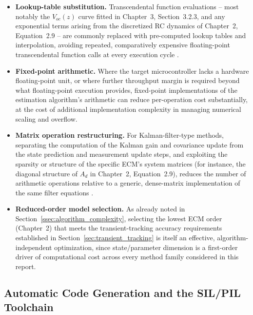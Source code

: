 \begin{itemize}
	\item \textbf{Lookup-table substitution.} Transcendental function evaluations -- most notably the $V_{oc}(z)$ curve fitted in Chapter~3, Section~3.2.3, and any exponential terms arising from the discretized RC dynamics of Chapter~2, Equation~2.9 -- are commonly replaced with pre-computed lookup tables and interpolation, avoiding repeated, comparatively expensive floating-point transcendental function calls at every execution cycle \cite{ekf_embedded_optimization_researchgate}.
	\item \textbf{Fixed-point arithmetic.} Where the target microcontroller lacks a hardware floating-point unit, or where further throughput margin is required beyond what floating-point execution provides, fixed-point implementations of the estimation algorithm's arithmetic can reduce per-operation cost substantially, at the cost of additional implementation complexity in managing numerical scaling and overflow.
	\item \textbf{Matrix operation restructuring.} For Kalman-filter-type methods, separating the computation of the Kalman gain and covariance update from the state prediction and measurement update steps, and exploiting the sparsity or structure of the specific ECM's system matrices (for instance, the diagonal structure of $A_d$ in Chapter~2, Equation~2.9), reduces the number of arithmetic operations relative to a generic, dense-matrix implementation of the same filter equations \cite{ekf_embedded_optimization_researchgate}.
	\item \textbf{Reduced-order model selection.} As already noted in Section~\ref{ssec:algorithm_complexity}, selecting the lowest ECM order (Chapter~2) that meets the transient-tracking accuracy requirements established in Section~\ref{sec:transient_tracking} is itself an effective, algorithm-independent optimization, since state/parameter dimension is a first-order driver of computational cost across every method family considered in this report.
\end{itemize}

\subsection{Automatic Code Generation and the SIL/PIL Toolchain}
\label{ssec:code_generation}

